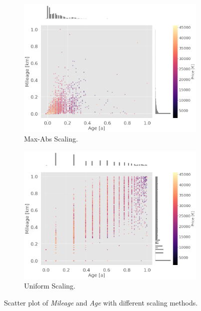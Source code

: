 \begin{figure}
\begin{subfigure}[b]{0.48\textwidth}
        \includegraphics[width=\textwidth]{"content/pics/Scatter_MaxAbs.png"}
        \caption{Max-Abs Scaling.}
    \end{subfigure}
    \hfill
    \begin{subfigure}[b]{0.48\textwidth}
        \centering
        \includegraphics[width=\textwidth]{"content/pics/Scatter_Uniform.png"}
        \caption{Uniform Scaling.}
    \end{subfigure}
    \caption{Scatter plot of \textit{Mileage} and \textit{Age} with different scaling methods.}
    \label{fig:Scaling}
\end{figure}
